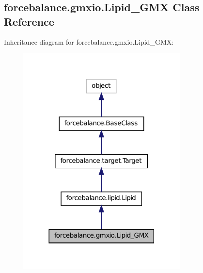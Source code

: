 \hypertarget{classforcebalance_1_1gmxio_1_1Lipid__GMX}{\subsection{forcebalance.\-gmxio.\-Lipid\-\_\-\-G\-M\-X Class Reference}
\label{classforcebalance_1_1gmxio_1_1Lipid__GMX}
}


Inheritance diagram for forcebalance.\-gmxio.\-Lipid\-\_\-\-G\-M\-X\-:
\nopagebreak
\begin{figure}[H]
\begin{center}
\leavevmode
\includegraphics[width=242pt]{classforcebalance_1_1gmxio_1_1Lipid__GMX__inherit__graph}
\end{center}
\end{figure}


